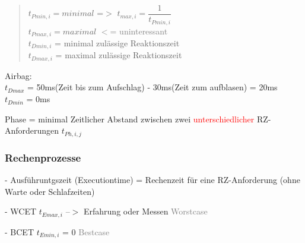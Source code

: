 \documentclass[12pt,a4paper,oneside,ngerman]{article}
\begin{document}

\begin{quote}
    \(t_{Pmin,i} = minimal\) =$>$ \(t_{max,i} = \dfrac{1}{ t_{Pmin,i} }\) \\
	\(t_{Pmax,i} = maximal\) \textcolor{gray}{$<$= uninteressant} \\
	\(t_{Dmin,i}\) = minimal zulässige Reaktionszeit \\
	\(t_{Dmax,i}\) = maximal zulässige Reaktionszeit
\end{quote}

Airbag: \\
\(t_{Dmax}\) = 50ms(Zeit bis zum Aufschlag) - 30ms(Zeit zum aufblasen) = 20ms \\
\(t_{Dmin}\) = 0ms

Phase = minimal Zeitlicher Abstand zwischen zwei \textcolor{red}{unterschiedlicher} RZ-Anforderungen \(t_{Ph,i,j}\) \\

\subsubsection{Rechenprozesse}

\begin{description}
\item - Ausführuntgszeit (Executiontime) = Rechenzeit für eine RZ-Anforderung (ohne Warte oder Schlafzeiten)	
	\begin{description}
		\item - WCET \(t_{Emax,i}\) --$>$ Erfahrung oder Messen \textcolor{gray}{Worstcase}
		\item - BCET \(t_{Emin,i}\) = 0 \textcolor{gray}{Bestcase}
	\end{description}
\end{description}
\end{document}
